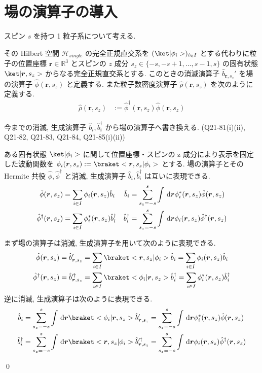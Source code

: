 \documentclass[uplatex,dvipdfmx,a4paper,11pt]{jlreq}
\makeatletter
\newcommand{\RR}{\mathbb{R}}
\newcommand{\HH}{\mathcal{H}}
\newcommand{\rr}{\bm{r}}
\numberwithin{equation}{section}
\theoremstyle{definition}
\renewenvironment{proof}[1][\proofname]{\par
  \normalfont
  \topsep6\p@\@plus6\p@ \trivlist
  \item[\hskip\labelsep{\bfseries #1}\@addpunct{\bfseries}]\ignorespaces\quad\par
}{
  \qed\endtrivlist\@endpefalse
}
\renewcommand\proofname{証明}
\makeatother
\begin{document}
\section{場の演算子の導入}
\begin{definition}[場の演算子]
  スピン $s$ を持つ 1 粒子系について考える.

  その Hilbert 空間 $\HH_{single}$ の完全正規直交系を $(\ket|\phi_i>)_{i\in I}$ とする代わりに粒子の位置座標 $\rr\in\RR^3$ とスピンの $z$ 成分 $s_z\in\{-s,-s+1,\ldots,s-1,s\}$ の固有状態 $\ket|\rr, s_z>$ からなる完全正規直交系とする.
  このときの消滅演算子 $\hat{b}_{\rr,s_z}'$ を場の演算子 $\hat{\phi}(\rr, s_z)$ と定義する.
  また粒子数密度演算子 $\hat{\rho}(\rr, s_z)$ を次のように定義する.
  \begin{align}
    \hat{\rho}(\rr, s_z) & := \hat{\phi}^\dagger(\rr, s_z)\hat{\phi}(\rr, s_z)
  \end{align}
\end{definition}
今までの消滅, 生成演算子 $\hat{b}_i, \hat{b}_i^\dagger$ から場の演算子へ書き換える. (Q21-81(i)(ii), Q21-82, Q21-83, Q21-84, Q21-85(i)(ii))
\begin{theorem}
  ある固有状態 $\ket|\phi_i>$ に関して位置座標・スピンの z 成分により表示を固定した波動関数を $\phi_i(\rr, s_z) := \braket<\rr, s_z|\phi_i>$ とする.
  場の演算子とその Hermite 共役 $\hat{\phi}, \hat{\phi}^\dagger$ と消滅, 生成演算子 $\hat{b}_i, \hat{b}_i^\dagger$ は互いに表現できる.
  \begin{align}
    \hat{\phi}(\rr, s_z)         & = \sum_{i\in I}\phi_i(\rr, s_z)\hat{b}_i           & \hat{b}_i         & = \sum_{s_z = -s}^s\int\dl{\rr}\phi_i^*(\rr, s_z)\hat{\phi}(\rr, s_z)       \\
    \hat{\phi}^\dagger(\rr, s_z) & = \sum_{i\in I}\phi_i^*(\rr, s_z)\hat{b}_i^\dagger & \hat{b}_i^\dagger & = \sum_{s_z = -s}^s\int\dl{\rr}\phi_i(\rr, s_z)\hat{\phi}^\dagger(\rr, s_z)
  \end{align}
\end{theorem}
\begin{proof}
  まず場の演算子は消滅, 生成演算子を用いて次のように表現できる.
  \begin{align}
    \hat{\phi}(\rr, s_z)         & = \hat{b}_{\rr,s_z}' = \sum_{i\in I}\braket<\rr,s_z|\phi_i>\hat{b}_i = \sum_{i\in I}\phi_i(\rr, s_z)\hat{b}_i                                  \\
    \hat{\phi}^\dagger(\rr, s_z) & = \hat{b}_{\rr,s_z}^{\prime\dagger} = \sum_{i\in I}\braket<\phi_i|\rr,s_z>\hat{b}_i^\dagger = \sum_{i\in I}\phi_i^*(\rr, s_z)\hat{b}_i^\dagger
  \end{align}
  逆に消滅, 生成演算子は次のように表現できる.
  \begin{align}
    \hat{b}_i         & = \sum_{s_z = -s}^s\int\dl{\rr}\braket<\phi_i|\rr, s_z>\hat{b}_{\rr,s_z}' = \sum_{s_z = -s}^s\int\dl{\rr}\phi_i^*(\rr, s_z)\hat{\phi}(\rr, s_z)                      \\
    \hat{b}_i^\dagger & = \sum_{s_z = -s}^s\int\dl{\rr}\braket<\rr, s_z|\phi_i>\hat{b}_{\rr,s_z}^{\prime\dagger} = \sum_{s_z = -s}^s\int\dl{\rr}\phi_i(\rr, s_z)\hat{\phi}^\dagger(\rr, s_z)
  \end{align}
\end{proof}
\end{document}
